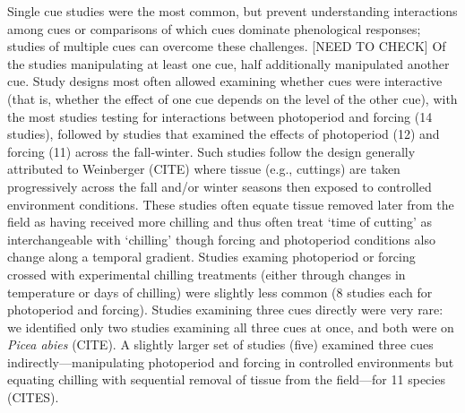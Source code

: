 \documentclass[11pt,letter]{article}
\begin{document}
Single cue studies were the most common, but prevent understanding interactions among cues or comparisons of which cues dominate phenological responses; studies of multiple cues can overcome these challenges. [NEED TO CHECK] Of the studies manipulating at least one cue, half additionally manipulated another cue. Study designs most often allowed examining whether cues were interactive (that is, whether the effect of one cue depends on the level of the other cue), with the most studies testing for interactions between photoperiod and forcing (14 studies), followed by studies that examined the effects of photoperiod (12) and forcing (11) across the fall-winter. Such studies follow the design generally attributed to Weinberger (CITE) where tissue (e.g., cuttings) are taken progressively across the fall and/or winter seasons then exposed to controlled environment conditions. These studies often equate tissue removed later from the field as having received more chilling and thus often treat `time of cutting' as interchangeable with `chilling' though forcing and photoperiod conditions also change along a temporal gradient. Studies examing photoperiod or forcing crossed with experimental chilling treatments (either through changes in temperature or days of chilling) were slightly less common (8 studies each for photoperiod and forcing). Studies examining three cues directly were very rare: we identified only two studies examining all three cues at once, and both were on \emph{Picea abies} (CITE). A slightly larger set of studies (five) examined three cues indirectly---manipulating photoperiod and forcing in controlled environments but equating chilling with sequential removal of tissue from the field---for 11 species (CITES). \\
\end{document}
